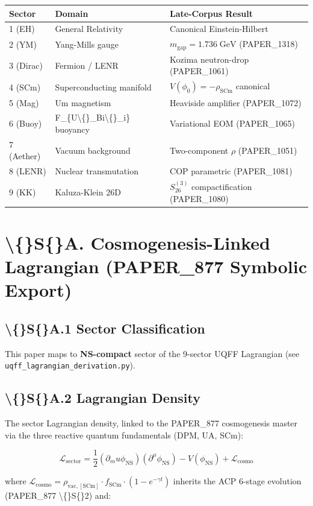 \documentclass[11pt]{article}
\begin{document}
\begin{center}
\begin{longtable}{lll}
\toprule
Sector & Domain & Late-Corpus Result \tabularnewline
\midrule
\endhead
1 (EH) & General Relativity & Canonical Einstein-Hilbert \tabularnewline
2 (YM) & Yang-Mills gauge & $m_{\text{gap}} = 1.736\;\text{GeV}$ (PAPER\_1318) \tabularnewline
3 (Dirac) & Fermion / LENR & Kozima neutron-drop (PAPER\_1061) \tabularnewline
4 (SCm) & Superconducting manifold & $V(\phi_0) = -\rho_{\text{SCm}}$ canonical \tabularnewline
5 (Mag) & Um magnetism & Heaviside amplifier (PAPER\_1072) \tabularnewline
6 (Buoy) & F\_\{U\textbackslash\{\}\_Bi\textbackslash\{\}\_i\} buoyancy & Variational EOM (PAPER\_1065) \tabularnewline
7 (Aether) & Vacuum background & Two-component $\rho$ (PAPER\_1051) \tabularnewline
8 (LENR) & Nuclear transmutation & COP parametric (PAPER\_1081) \tabularnewline
9 (KK) & Kaluza-Klein 26D & $S_{26}^{(3)}$ compactification (PAPER\_1080) \tabularnewline
\bottomrule
\end{longtable}
\end{center}

\section*{\textbackslash\{\}S\{\}A. Cosmogenesis-Linked Lagrangian (PAPER\_877 Symbolic Export)}

\subsection*{\textbackslash\{\}S\{\}A.1 Sector Classification}

This paper maps to \textbf{NS-compact} sector of the 9-sector UQFF Lagrangian (see \verb|uqff_lagrangian_derivation.py|).

\subsection*{\textbackslash\{\}S\{\}A.2 Lagrangian Density}

The sector Lagrangian density, linked to the PAPER\_877 cosmogenesis master via the three reactive quantum fundamentals (DPM, UA, SCm):

$$\mathcal{L}_{\mathrm{sector}} = \frac{1}{2}(\partial_mu \phi_{\mathrm{NS}})(\partial^\mu \phi_{\mathrm{NS}}) - V(\phi_{\mathrm{NS}}) + \mathcal{L}_{\mathrm{cosmo}}$$

where $\mathcal{L}_{\mathrm{cosmo}} = \rho_{\mathrm{vac,[SCm]}} \cdot f_{\mathrm{SCm}} \cdot (1 - e^{-\gamma t})$ inherits the ACP 6-stage evolution (PAPER\_877 \textbackslash\{\}S\{\}2) and:
\end{document}
